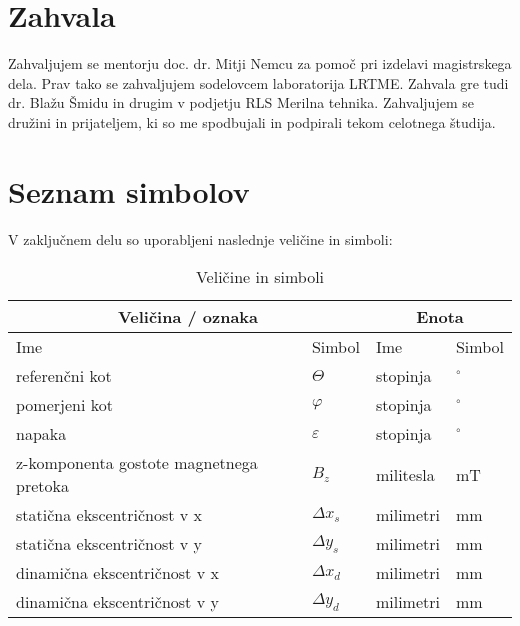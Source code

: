 \documentclass[a4paper,twoside,openright,12pt]{book}
\date{Ljubljana, 2018}
\begin{document}
\frontmatter
\maketitle
\chapter*{Zahvala}
Zahvaljujem se mentorju doc. dr. Mitji Nemcu za pomoč pri izdelavi magistrskega dela. Prav tako se zahvaljujem sodelovcem laboratorija LRTME.
Zahvala gre tudi dr. Blažu Šmidu in drugim v podjetju RLS Merilna tehnika.
Zahvaljujem se družini in prijateljem, ki so me spodbujali in podpirali tekom celotnega študija.
\tableofcontents
\chapter*{Seznam simbolov}
V zaključnem delu so uporabljeni naslednje veličine in
simboli:
\begin{table}[h]
\centering
\begin{tabular}{l l l l}
 \hline \multicolumn{2}{c}{\bf{Veličina / oznaka}} & \multicolumn{2}{c}{\bf{Enota}}  \\
 \hline
Ime & Simbol & Ime & Simbol \\
 \hline
 referenčni kot & $\Theta$  & stopinja & $^\circ$ \\
 pomerjeni kot & $\varphi$  & stopinja & $^\circ$ \\
 napaka& $\varepsilon$& stopinja & $^\circ$ \\
 z-komponenta gostote magnetnega pretoka&$B_z$& militesla & mT \\
 statična ekscentričnost v x&$\Delta x_s$& milimetri & mm \\
 statična ekscentričnost v y&$\Delta y_s$& milimetri & mm \\
 dinamična ekscentričnost v x&$\Delta x_d$& milimetri & mm \\
 dinamična ekscentričnost v y&$\Delta y_d$& milimetri & mm \\
  \hline
\end{tabular}
  \caption{Veličine in simboli}
  \label{prebojne_trdnosti}
\end{table}
\mainmatter
\end{document}
